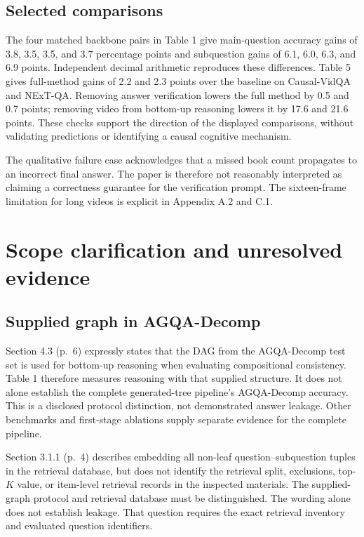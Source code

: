 \documentclass[10pt]{article}
\begin{document}
\subsection*{Selected comparisons}
The four matched backbone pairs in Table 1 give main-question accuracy gains of 3.8, 3.5, 3.5, and 3.7 percentage points and subquestion gains of 6.1, 6.0, 6.3, and 6.9 points. Independent decimal arithmetic reproduces these differences. Table 5 gives full-method gains of 2.2 and 2.3 points over the baseline on Causal-VidQA and NExT-QA. Removing answer verification lowers the full method by 0.5 and 0.7 points; removing video from bottom-up reasoning lowers it by 17.6 and 21.6 points. These checks support the direction of the displayed comparisons, without validating predictions or identifying a causal cognitive mechanism.\par
The qualitative failure case acknowledges that a missed book count propagates to an incorrect final answer. The paper is therefore not reasonably interpreted as claiming a correctness guarantee for the verification prompt. The sixteen-frame limitation for long videos is explicit in Appendix A.2 and C.1.\par
\section*{Scope clarification and unresolved evidence}
\subsection*{Supplied graph in AGQA-Decomp}
Section 4.3 (p. 6) expressly states that the DAG from the AGQA-Decomp test set is used for bottom-up reasoning when evaluating compositional consistency. Table 1 therefore measures reasoning with that supplied structure. It does not alone establish the complete generated-tree pipeline’s AGQA-Decomp accuracy. This is a disclosed protocol distinction, not demonstrated answer leakage. Other benchmarks and first-stage ablations supply separate evidence for the complete pipeline.\par
Section 3.1.1 (p. 4) describes embedding all non-leaf question–subquestion tuples in the retrieval database, but does not identify the retrieval split, exclusions, top-\(K\) value, or item-level retrieval records in the inspected materials. The supplied-graph protocol and retrieval database must be distinguished. The wording alone does not establish leakage. That question requires the exact retrieval inventory and evaluated question identifiers.\par
\end{document}
